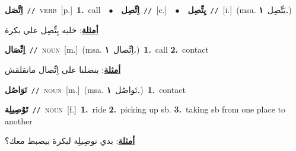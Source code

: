 \documentclass[10pt,a4paper,twoside]{article} %
\begin{document}
\begin{multicols}{2}
{\setlength\topsep{0pt}\textbf{\foreignlanguage{arabic}{اِتَّصَل}}\ {\color{gray}\texttt{//}\color{black}}\ \textsc{verb}\ [p.]\ \textbf{1.}~call\ \ $\bullet$\ \ \setlength\topsep{0pt}\textbf{\foreignlanguage{arabic}{اِتِّصِل}}\ {\color{gray}\texttt{//}\color{black}}\ [c.]\ \ $\bullet$\ \ \setlength\topsep{0pt}\textbf{\foreignlanguage{arabic}{يِتِّصِل}}\ {\color{gray}\texttt{//}\color{black}}\ [i.]\ \color{gray}(msa. \foreignlanguage{arabic}{يَتِّصِل}~\foreignlanguage{arabic}{\textbf{١.}})\color{black}\  \begin{flushright}\color{gray}\foreignlanguage{arabic}{\textbf{\underline{\foreignlanguage{arabic}{أمثلة}}}: خليه يِتِّصِل علي بكرة}\end{flushright}\color{black}} \vspace{2mm}

{\setlength\topsep{0pt}\textbf{\foreignlanguage{arabic}{اِتِّصَال}}\ {\color{gray}\texttt{//}\color{black}}\ \textsc{noun}\ [m.]\ \color{gray}(msa. \foreignlanguage{arabic}{اِتِّصال}~\foreignlanguage{arabic}{\textbf{١.}})\color{black}\ \textbf{1.}~call  \textbf{2.}~contact\  \begin{flushright}\color{gray}\foreignlanguage{arabic}{\textbf{\underline{\foreignlanguage{arabic}{أمثلة}}}: بنضلنا على اِتِّصال ماتقلقش}\end{flushright}\color{black}} \vspace{2mm}

{\setlength\topsep{0pt}\textbf{\foreignlanguage{arabic}{تَوَاصُل}}\ {\color{gray}\texttt{//}\color{black}}\ \textsc{noun}\ [m.]\ \color{gray}(msa. \foreignlanguage{arabic}{تَواصُل}~\foreignlanguage{arabic}{\textbf{١.}})\color{black}\ \textbf{1.}~contact\ } \vspace{2mm}

{\setlength\topsep{0pt}\textbf{\foreignlanguage{arabic}{تَوْصِيلِة}}\ {\color{gray}\texttt{//}\color{black}}\ \textsc{noun}\ [f.]\ \textbf{1.}~ride  \textbf{2.}~picking up sb.  \textbf{3.}~taking sb from one place to another\  \begin{flushright}\color{gray}\foreignlanguage{arabic}{\textbf{\underline{\foreignlanguage{arabic}{أمثلة}}}: بدي توصِيلِة لبكرة بيضبط معك؟}\end{flushright}\color{black}} \vspace{2mm}


\end{multicols}
\end{document}
